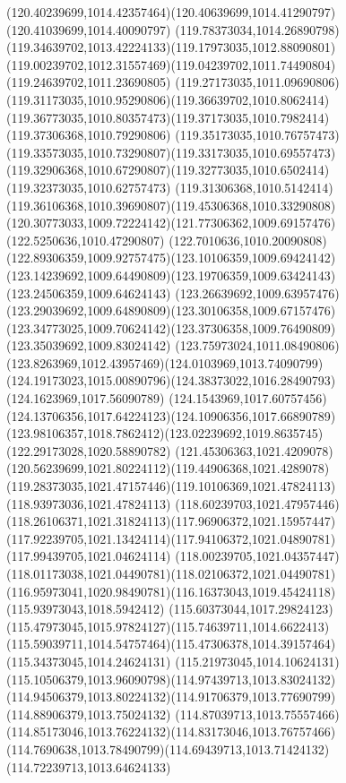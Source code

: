 {{\curveto(120.40239699,1014.42357464)(120.40639699,1014.41290797)(120.41039699,1014.40090797)
\curveto(119.78373034,1014.26890798)(119.34639702,1013.42224133)(119.17973035,1012.88090801)
\curveto(119.00239702,1012.31557469)(119.04239702,1011.74490804)(119.24639702,1011.23690805)
\curveto(119.27173035,1011.09690806)(119.31173035,1010.95290806)(119.36639702,1010.8062414)
\curveto(119.36773035,1010.80357473)(119.37173035,1010.7982414)(119.37306368,1010.79290806)
\curveto(119.35173035,1010.76757473)(119.33573035,1010.73290807)(119.33173035,1010.69557473)
\curveto(119.32906368,1010.67290807)(119.32773035,1010.6502414)(119.32373035,1010.62757473)
\curveto(119.31306368,1010.5142414)(119.36106368,1010.39690807)(119.45306368,1010.33290808)
\curveto(120.30773033,1009.72224142)(121.77306362,1009.69157476)(122.5250636,1010.47290807)
\curveto(122.7010636,1010.20090808)(122.89306359,1009.92757475)(123.10106359,1009.69424142)
\curveto(123.14239692,1009.64490809)(123.19706359,1009.63424143)(123.24506359,1009.64624143)
\curveto(123.26639692,1009.63957476)(123.29039692,1009.64890809)(123.30106358,1009.67157476)
\curveto(123.34773025,1009.70624142)(123.37306358,1009.76490809)(123.35039692,1009.83024142)
\curveto(123.75973024,1011.08490806)(123.8263969,1012.43957469)(124.0103969,1013.74090799)
\curveto(124.19173023,1015.00890796)(124.38373022,1016.28490793)(124.1623969,1017.56090789)
\curveto(124.1543969,1017.60757456)(124.13706356,1017.64224123)(124.10906356,1017.66890789)
\curveto(123.98106357,1018.7862412)(123.02239692,1019.8635745)(122.29173028,1020.58890782)
\curveto(121.45306363,1021.4209078)(120.56239699,1021.80224112)(119.44906368,1021.4289078)
\curveto(119.28373035,1021.47157446)(119.10106369,1021.47824113)(118.93973036,1021.47824113)
\curveto(118.60239703,1021.47957446)(118.26106371,1021.31824113)(117.96906372,1021.15957447)
\curveto(117.92239705,1021.13424114)(117.94106372,1021.04890781)(117.99439705,1021.04624114)
\curveto(118.00239705,1021.04357447)(118.01173038,1021.04490781)(118.02106372,1021.04490781)
\curveto(116.95973041,1020.98490781)(116.16373043,1019.45424118)(115.93973043,1018.5942412)
\curveto(115.60373044,1017.29824123)(115.47973045,1015.97824127)(115.74639711,1014.6622413)
\curveto(115.59039711,1014.54757464)(115.47306378,1014.39157464)(115.34373045,1014.24624131)
\curveto(115.21973045,1014.10624131)(115.10506379,1013.96090798)(114.97439713,1013.83024132)
\curveto(114.94506379,1013.80224132)(114.91706379,1013.77690799)(114.88906379,1013.75024132)
\curveto(114.87039713,1013.75557466)(114.85173046,1013.76224132)(114.83173046,1013.76757466)
\curveto(114.7690638,1013.78490799)(114.69439713,1013.71424132)(114.72239713,1013.64624133)
}}
